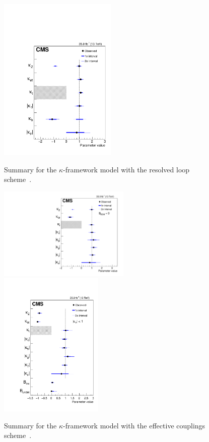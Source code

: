 \begin{figure}[!ht]
\begin{center}
\includegraphics[width=0.5\textwidth]{Fig/HIG17031/plot_K1_mm_merged}\\
\caption{Summary for the $\kappa$-framework model with the resolved loop scheme~\cite{CMS-PAS-HIG-17-031}. \label{fig:kappaCMS2016_1}}
\end{center}
\end{figure}

\begin{figure}[!ht]
\begin{center}
\includegraphics[width=0.56\textwidth]{Fig/HIG17031/plot_K2_merged}~
\includegraphics[width=0.44\textwidth]{Fig/HIG17031/plot_K2Undet_merged}\\
\caption{Summary for the $\kappa$-framework model with the effective couplings scheme~\cite{CMS-PAS-HIG-17-031}. \label{fig:kappaCMS2016_2}}
\end{center}
\end{figure}

